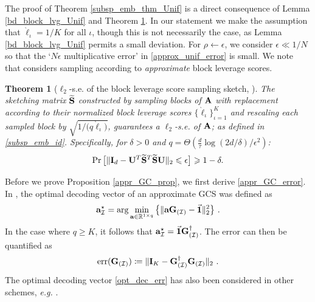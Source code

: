 \documentclass[journal,letterpaper,onecolumn,twoside,nofonttune]{IEEEtran}
\newcommand{\I}{\mathcal{I}}
\newcommand{\Ub}{\bold{U}}
\newcommand{\ellg}{\grave{\ell}}
\newcommand{\Gb}{\bold{G}}
\newcommand{\R}{\mathbb{R}}
\newcommand{\Sb}{\bold{S}}
\newcommand{\Sbwt}{\widetilde{\Sb}}
\newcommand{\Ab}{\bold{A}}
\newcommand{\ab}{\bold{a}}
\newcommand{\Ib}{\bold{I}}
\newcommand{\err}{\mathrm{err}}
\newtheorem{Thm}{Theorem}
\begin{document}
The proof of Theorem \ref{subsp_emb_thm_Unif} is a direct consequence of Lemma \ref{bd_block_lvg_Unif} and Theorem \ref{subsp_emb_thm_lvg}. In our statement we make the assumption that $\ellg_\iota=1/K$ for all $\iota$, though this is not necessarily the case, as Lemma \ref{bd_block_lvg_Unif} permits a small deviation. For $\rho\gets\epsilon$, we consider $\epsilon\ll 1/N$ so that the `$N\epsilon$ multiplicative error' in \eqref{approx_unif_error} is small. We note that \cite[Theorem 1]{CPH23b} considers sampling according to \textit{approximate} block leverage scores.%

\begin{Thm}[$\ell_2$-s.e. of the block leverage score sampling sketch, \cite{CPH23b}]
\label{subsp_emb_thm_lvg}
The sketching matrix $\Sbwt$ constructed by sampling blocks of $\Ab$ with replacement according to their normalized block leverage scores $\{\ellg_\iota\}_{\iota=1}^K$ and rescaling each sampled block by $\sqrt{1\big/\big(q\ellg_\iota\big)}$, guarantees a $\ell_2$-s.e. of $\Ab$; as defined in \eqref{subsp_emb_id}. Specifically, for $\delta>0$ and $q=\Theta(\frac{d}{\tau}\log{(2d/\delta)}/\epsilon^2)$:
\begin{equation*}
  \Pr\big[\|\Ib_d-\Ub^T\Sbwt^T\Sbwt \Ub\|_2\leqslant\epsilon\big]\geqslant 1-\delta.
\end{equation*}
\end{Thm}

Before we prove Proposition \ref{appr_GC_prop}, we first derive \eqref{appr_GC_error}. In \cite{CPE17}, the optimal decoding vector of an approximate GCS was defined as
\begin{equation}
\label{opt_dec_err}
  \ab_\I^\star = \arg\min_{\ab\in\R^{1\times q}}\big\{\|\ab\Gb_{(\I)}-\vec{\bold{1}}\|_2^2\big\}\ .
\end{equation}
In the case where $q\geqslant K$, it follows that $\ab_\I^\star = \vec{\bold{1}}\Gb_{(\I)}^{\dagger}$. The error can then be quantified as
$$ \err(\Gb_{(\I)}) \coloneqq \|\Ib_K-\Gb_{(\I)}^{\dagger}\Gb_{(\I)}\|_2\ . $$
The optimal decoding vector \eqref{opt_dec_err} has also been considered in other schemes, \textit{e.g.} \cite{KKR19,SH22}.
\end{document}
